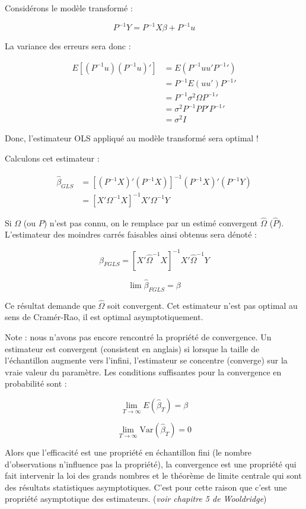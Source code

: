 \documentclass[14pt]{extarticle} %
\theoremstyle{definition}
\theoremstyle{plain}
\begin{document}
Considérons le modèle transformé :

\[
P^{-1}Y = P^{-1}X\beta + P^{-1}u
\]

La variance des erreurs sera donc :

\begin{align*}
E\left[(P^{-1}u)(P^{-1}u)'\right] &= E\left(P^{-1}uu'P^{-1}'\right) \\
&= P^{-1} E(uu') P^{-1}' \\
&= P^{-1} \sigma^2 \Omega P^{-1}' \\
&= \sigma^2 P^{-1} PP' P^{-1}' \\
&= \sigma^2 I
\end{align*}

Donc, l’estimateur OLS appliqué au modèle transformé sera optimal !

Calculons cet estimateur :

\begin{align*}
\hat{\beta}_{GLS} & = [(P^{-1}X)'(P^{-1}X)]^{-1}(P^{-1}X)'(P^{-1}Y) \\ &= [X'\Omega^{-1}X]^{-1}X'\Omega^{-1}Y
\end{align*}

Si $\Omega$ (ou $P$) n’est pas connu, on le remplace par un estimé convergent $\hat{\Omega}$ ($\hat{P}$). L’estimateur des moindres carrés faisables ainsi obtenus sera dénoté :

\[
\hat{\beta}_{FGLS} = [X'\hat{\Omega}^{-1}X]^{-1}X'\hat{\Omega}^{-1}Y
\]

\[
\lim \hat{\beta}_{FGLS} = \beta
\]

Ce résultat demande que $\hat{\Omega}$ soit convergent. Cet estimateur n’est pas optimal au sens de Cramér-Rao, il est optimal asymptotiquement.

Note : nous n’avons pas encore rencontré la propriété de convergence. Un estimateur est convergent (consistent en anglais) si lorsque la taille de l’échantillon augmente vers l’infini, l’estimateur se concentre (converge) sur la vraie valeur du paramètre. Les conditions suffisantes pour la convergence en probabilité sont :

\[
\lim_{T \to \infty} E(\hat{\beta}_T) = \beta
\]

\[
\lim_{T \to \infty} \text{Var}(\hat{\beta}_T) = 0
\]

Alors que l’efficacité est une propriété en échantillon fini (le nombre d’observations n’influence pas la propriété), la convergence est une propriété qui fait intervenir la loi des grands nombres et le théorème de limite centrale qui sont des résultats statistiques asymptotiques. C’est pour cette raison que c’est une propriété asymptotique des estimateurs. (\textit{voir chapitre 5 de Wooldridge})
\end{document}
